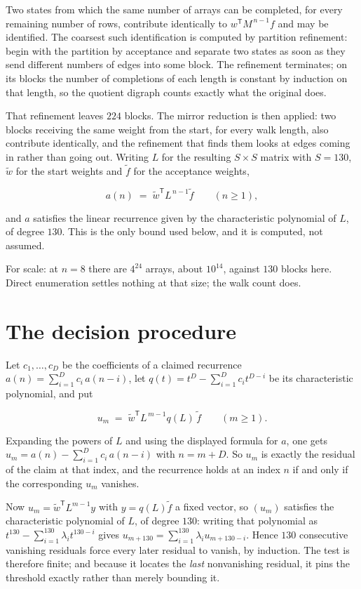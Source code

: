 \documentclass[11pt]{article}
\theoremstyle{definition}
\begin{document}
Two states from which the same number of arrays can be completed, for every remaining number of rows, contribute identically to $w^{\mathsf T}M^{\,n-1}f$ and may be identified. The coarsest such identification is computed by partition refinement: begin with the partition by acceptance and separate two states as soon as they send different numbers of edges into some block. The refinement terminates; on its blocks the number of completions of each length is constant by induction on that length, so the quotient digraph counts exactly what the original does.

That refinement leaves $224$ blocks. The mirror reduction is then applied: two blocks receiving the same weight from the start, for every walk length, also contribute identically, and the refinement that finds them looks at edges coming in rather than going out. Writing $L$ for the resulting $S \times S$ matrix with $S = 130$, $\tilde w$ for the start weights and $\tilde f$ for the acceptance weights,

\[a(n) \;=\; \tilde w^{\mathsf T} L^{\,n-1} \tilde f \qquad (n \ge 1),\]

and $a$ satisfies the linear recurrence given by the characteristic polynomial of $L$, of degree $130$. This is the only bound used below, and it is computed, not assumed.

For scale: at $n = 8$ there are $4^{24}$ arrays, about $10^{14}$, against $130$ blocks here. Direct enumeration settles nothing at that size; the walk count does.

\section{The decision procedure}

Let $c_1,\dots,c_D$ be the coefficients of a claimed recurrence $a(n) = \sum_{i=1}^{D} c_i\,a(n-i)$, let $q(t) = t^{D} - \sum_{i=1}^{D} c_i t^{D-i}$ be its characteristic polynomial, and put

\[u_m \;=\; \tilde w^{\mathsf T} L^{\,m-1} q(L)\,\tilde f \qquad (m \ge 1).\]

Expanding the powers of $L$ and using the displayed formula for $a$, one gets $u_m = a(n) - \sum_{i=1}^{D} c_i\,a(n-i)$ with $n = m + D$. So $u_m$ is exactly the residual of the claim at that index, and the recurrence holds at an index $n$ if and only if the corresponding $u_m$ vanishes.

Now $u_m = \tilde w^{\mathsf T} L^{m-1} y$ with $y = q(L)\tilde f$ a fixed vector, so $(u_m)$ satisfies the characteristic polynomial of $L$, of degree $130$: writing that polynomial as $t^{130} - \sum_{i=1}^{130} \lambda_i t^{130-i}$ gives $u_{m+130} = \sum_{i=1}^{130} \lambda_i u_{m+130-i}$. Hence $130$ consecutive vanishing residuals force every later residual to vanish, by induction. The test is therefore finite; and because it locates the {\itshape last} nonvanishing residual, it pins the threshold exactly rather than merely bounding it.
\end{document}
